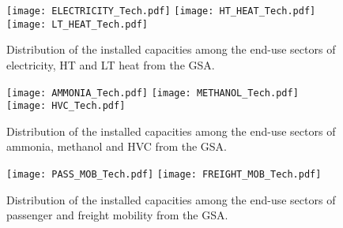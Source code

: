 \begin{figure}[htbp!]
\centering
\texttt{[image: ELECTRICITY\_Tech.pdf]}
\texttt{[image: HT\_HEAT\_Tech.pdf]}
\texttt{[image: LT\_HEAT\_Tech.pdf]}
\caption{Distribution of the installed capacities among the end-use sectors of electricity, \gls{HT} and \gls{LT} heat from the \acrfull{GSA}.}
\label{fig:results_uq_tech_cap_ELEC_HT_LT}
\end{figure}

\begin{figure}[htbp!]
\centering
\texttt{[image: AMMONIA\_Tech.pdf]}
\texttt{[image: METHANOL\_Tech.pdf]}
\texttt{[image: HVC\_Tech.pdf]}
\caption{Distribution of the installed capacities among the end-use sectors of ammonia, methanol and \gls{HVC} from the \acrfull{GSA}.}
\label{fig:results_uq_tech_cap_NED}
\end{figure}

\begin{figure}[htbp!]
\centering
\texttt{[image: PASS\_MOB\_Tech.pdf]}
\texttt{[image: FREIGHT\_MOB\_Tech.pdf]}
\caption{Distribution of the installed capacities among the end-use sectors of passenger and freight mobility from the \acrfull{GSA}.}
\label{fig:results_uq_tech_cap_MOB}
\end{figure}